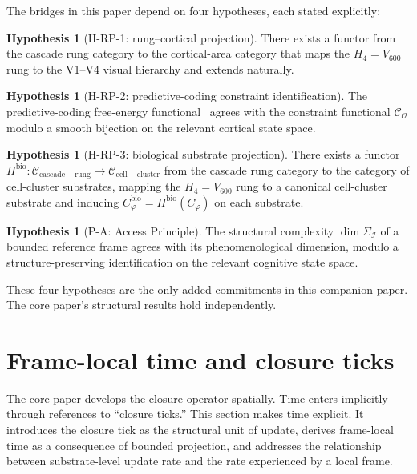 \documentclass[11pt]{article}
\theoremstyle{plain}
\theoremstyle{definition}
\newtheorem{hypothesis}[theorem]{Hypothesis}
\theoremstyle{remark}
\newcommand{\Ical}{\mathcal{I}}
\newcommand{\Ocal}{\mathcal{O}}
\newcommand{\Ccal}{\mathcal{C}}
\newcommand{\Cph}{C_\varphi}
\newcommand{\catC}{\mathcal{C}}
\begin{document}
The bridges in this paper depend on four hypotheses, each stated explicitly:

\begin{hypothesis}[H-RP-1: rung--cortical projection]\label{hyp:rp-1}
There exists a functor from the cascade rung category to the cortical-area category that maps the $H_4 = V_{600}$ rung to the V1--V4 visual hierarchy and extends naturally.
\end{hypothesis}

\begin{hypothesis}[H-RP-2: predictive-coding constraint identification]\label{hyp:rp-2}
The predictive-coding free-energy functional~\citep{FristonFreeEnergy} agrees with the constraint functional $\Ccal_\Ocal$ modulo a smooth bijection on the relevant cortical state space.
\end{hypothesis}

\begin{hypothesis}[H-RP-3: biological substrate projection]\label{hyp:rp-3}
There exists a functor $\Pi^{\mathrm{bio}} : \catC_{\mathrm{cascade-rung}} \to \catC_{\mathrm{cell-cluster}}$ from the cascade rung category to the category of cell-cluster substrates, mapping the $H_4 = V_{600}$ rung to a canonical cell-cluster substrate and inducing $\Cph^{\mathrm{bio}} = \Pi^{\mathrm{bio}}(\Cph)$ on each substrate.
\end{hypothesis}

\begin{hypothesis}[P-A: Access Principle]\label{hyp:p-a}
The structural complexity $\dim \Sigma_\Ical$ of a bounded reference frame agrees with its phenomenological dimension, modulo a structure-preserving identification on the relevant cognitive state space.
\end{hypothesis}

These four hypotheses are the only added commitments in this companion paper. The core paper's structural results hold independently.

\section{Frame-local time and closure ticks}\label{sec:time}

The core paper develops the closure operator spatially. Time enters implicitly through references to ``closure ticks.'' This section makes time explicit. It introduces the closure tick as the structural unit of update, derives frame-local time as a consequence of bounded projection, and addresses the relationship between substrate-level update rate and the rate experienced by a local frame.
\end{document}
